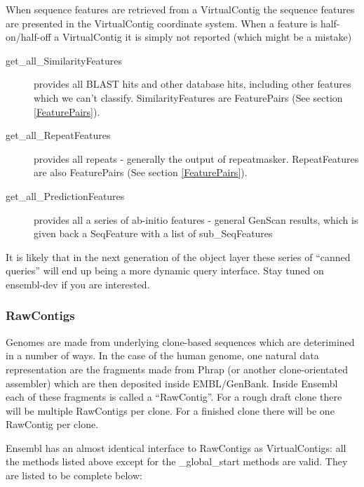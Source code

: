 \documentclass[11pt,a4paper]{article}
\begin{document}
When sequence features are retrieved from a VirtualContig the sequence features are presented
in the VirtualContig coordinate system. When a feature is half-on/half-off a VirtualContig it
is simply not reported (which might be a mistake)

\begin{description}

\item[get\_all\_SimilarityFeatures] provides all BLAST hits and other
database hits, including other features which we can't
classify. SimilarityFeatures are FeaturePairs (See section
\ref{FeaturePairs}).

\item[get\_all\_RepeatFeatures] provides all repeats - generally the
output of repeatmasker. RepeatFeatures are also FeaturePairs (See
section \ref{FeaturePairs}).

\item[get\_all\_PredictionFeatures] provides all a series of ab-initio
features - general GenScan results, which is given back a SeqFeature
with a list of sub\_SeqFeatures

\end{description}

It is likely that in the next generation of the object layer these
series of ``canned queries'' will end up being a more dynamic query
interface. Stay tuned on ensembl-dev if you are interested.


\subsubsection{RawContigs}

Genomes are made from underlying clone-based sequences which are
deterimined in a number of ways. In the case of the human genome, one
natural data representation are the fragments made from Phrap (or
another clone-orientated assembler) which are then deposited inside
EMBL/GenBank. Inside Ensembl each of these fragments is called a
``RawContig''. For a rough draft clone there will be multiple
RawContigs per clone. For a finished clone there will be one
RawContig per clone.

Ensembl has an almost identical interface to RawContigs as VirtualContigs:
all the methods listed above except for the \_global\_start methods are valid.
They are listed to be complete below:
\end{document}
